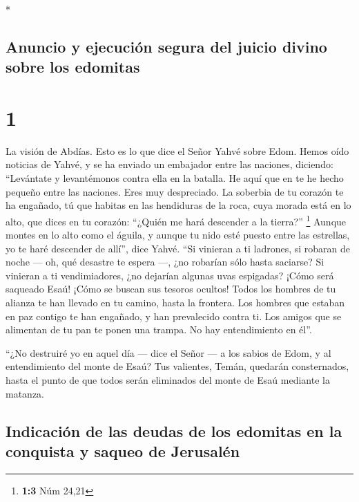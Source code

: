 \begin{paracol}{2} \switchcolumn[0]*

\hypertarget{anuncio-y-ejecuciuxf3n-segura-del-juicio-divino-sobre-los-edomitas}{%
\subsection{Anuncio y ejecución segura del juicio divino sobre los
edomitas}\label{anuncio-y-ejecuciuxf3n-segura-del-juicio-divino-sobre-los-edomitas}}

\hypertarget{section}{%
\section{1}\label{section}}

 La visión de Abdías. Esto es lo que dice el Señor Yahvé
sobre Edom. Hemos oído noticias de Yahvé, y se ha enviado un embajador
entre las naciones, diciendo: ``Levántate y levantémonos contra ella en
la batalla.  He aquí que en te he hecho pequeño entre las
naciones. Eres muy despreciado.  La soberbia de tu corazón
te ha engañado, tú que habitas en las hendiduras de la roca, cuya morada
está en lo alto, que dices en tu corazón: ``¿Quién me hará descender a
la tierra?'' \footnote{\textbf{1:3} Núm 24,21}  Aunque
montes en lo alto como el águila, y aunque tu nido esté puesto entre las
estrellas, yo te haré descender de allí'', dice Yahvé. 
``Si vinieran a ti ladrones, si robaran de noche --- oh, qué desastre te
espera ---, ¿no robarían sólo hasta saciarse? Si vinieran a ti
vendimiadores, ¿no dejarían algunas uvas espigadas?  ¡Cómo
será saqueado Esaú! ¡Cómo se buscan sus tesoros ocultos! 
Todos los hombres de tu alianza te han llevado en tu camino, hasta la
frontera. Los hombres que estaban en paz contigo te han engañado, y han
prevalecido contra ti. Los amigos que se alimentan de tu pan te ponen
una trampa. No hay entendimiento en él''.

 ``¿No destruiré yo en aquel día --- dice el Señor --- a
los sabios de Edom, y al entendimiento del monte de Esaú? 
Tus valientes, Temán, quedarán consternados, hasta el punto de que todos
serán eliminados del monte de Esaú mediante la matanza.

\hypertarget{indicaciuxf3n-de-las-deudas-de-los-edomitas-en-la-conquista-y-saqueo-de-jerusaluxe9n}{%
\subsection{Indicación de las deudas de los edomitas en la conquista y
saqueo de
Jerusalén}\label{indicaciuxf3n-de-las-deudas-de-los-edomitas-en-la-conquista-y-saqueo-de-jerusaluxe9n}}


\end{paracol}
